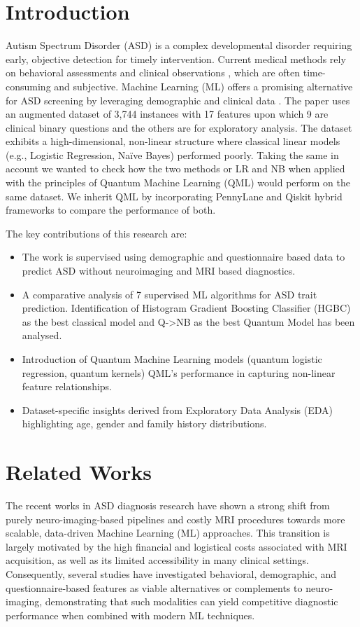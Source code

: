 \documentclass[runningheads]{llncs}
\begin{document}
\section{Introduction}\label{sec1}
Autism Spectrum Disorder (ASD) \cite{cdc2024} is a complex developmental disorder requiring early, objective detection for timely intervention. Current medical methods rely on behavioral assessments and clinical observations \cite{lord1994}, which are often time-consuming and subjective.
Machine Learning (ML) offers a promising alternative for ASD screening by leveraging demographic and clinical data \cite{vakadkar2021}. 
The paper uses an augmented  dataset of 3,744 instances with 17 features upon which 9 are clinical binary questions and the others are 
for exploratory analysis. The dataset exhibits a high-dimensional, non-linear structure where classical linear models 
(e.g., Logistic Regression, Na\"{i}ve Bayes) performed poorly. Taking the same in account we wanted to check how the two methods or LR and NB 
when applied with the principles of Quantum Machine Learning (QML) would perform on the same dataset. We inherit QML by incorporating
PennyLane and Qiskit hybrid frameworks to compare the performance of both.

The key contributions of this research are:
\begin{itemize}
\item The work is supervised using demographic and questionnaire based data to predict ASD without neuroimaging and MRI based diagnostics.
\item A comparative analysis of 7 supervised ML algorithms for ASD trait prediction. Identification of Histogram Gradient Boosting Classifier (HGBC) as the best classical model and Q->NB as the best Quantum Model has been analysed.
\item Introduction of Quantum Machine Learning models (quantum logistic regression, quantum kernels) QML's performance in capturing non-linear feature relationships.
\item Dataset-specific insights derived from Exploratory Data Analysis (EDA) highlighting age, gender and family history distributions.
\end{itemize}

\section{Related Works}\label{sec2}
The recent works in ASD diagnosis research have shown a strong shift from purely neuro-imaging-based pipelines and costly MRI procedures towards more scalable, data-driven Machine Learning (ML) approaches. This transition is largely motivated by the high financial and logistical costs associated with MRI acquisition, as well as its limited accessibility in many clinical settings. Consequently, several studies have investigated behavioral, demographic, and questionnaire-based features as viable alternatives or complements to neuro-imaging, demonstrating that such modalities can yield competitive diagnostic performance when combined with modern ML techniques.
\end{document}
